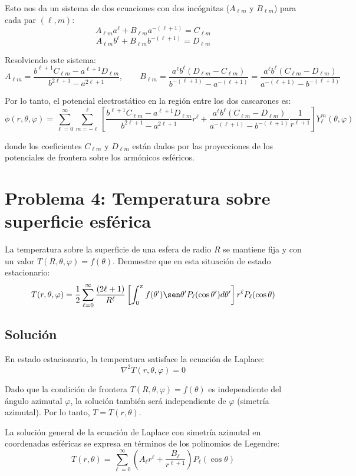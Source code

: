 \documentclass[a4paper]{article}
\begin{document}
Esto nos da un sistema de dos ecuaciones con dos incógnitas ($A_{\ell m}$ y $B_{\ell m}$) para cada par $(\ell,m)$:
$$
A_{\ell m} a^\ell + B_{\ell m} a^{-(\ell+1)} = C_{\ell m}
$$
$$
A_{\ell m} b^\ell + B_{\ell m} b^{-(\ell+1)} = D_{\ell m}
$$

Resolviendo este sistema:
$$
A_{\ell m} = \frac{b^{\ell+1}C_{\ell m} - a^{\ell+1}D_{\ell m}}{b^{2\ell+1} - a^{2\ell+1}}, \qquad 
B_{\ell m} = \frac{a^\ell b^\ell (D_{\ell m} - C_{\ell m})}{b^{-(\ell+1)} - a^{-(\ell+1)}} = \frac{a^\ell b^\ell (C_{\ell m} - D_{\ell m})}{a^{-(\ell+1)} - b^{-(\ell+1)}}
$$

Por lo tanto, el potencial electrostático en la región entre los dos cascarones es:
$$
\phi(r,\theta,\varphi) = \sum_{\ell=0}^{\infty} \sum_{m=-\ell}^{\ell} \left[ \frac{b^{\ell+1}C_{\ell m} - a^{\ell+1}D_{\ell m}}{b^{2\ell+1} - a^{2\ell+1}} r^\ell + \frac{a^\ell b^\ell (C_{\ell m} - D_{\ell m})}{a^{-(\ell+1)} - b^{-(\ell+1)}} \frac{1}{r^{\ell+1}} \right] Y_\ell^m(\theta,\varphi)
$$

donde los coeficientes $C_{\ell m}$ y $D_{\ell m}$ están dados por las proyecciones de los potenciales de frontera sobre los armónicos esféricos.

\section{Problema 4: Temperatura sobre superficie esférica}
La temperatura sobre la superficie de una esfera de radio $R$ se mantiene fija y con un valor $T(R, \theta, \varphi) = f(\theta)$. Demuestre que en esta situación de estado estacionario:
$$
T(r,\theta,\varphi) = \frac{1}{2} \sum_{\ell=0}^{\infty} \frac{(2\ell+1)}{R^\ell} \left[ \int_0^{\pi} f(\theta') \sen\theta' P_\ell(\cos\theta') d\theta' \right] r^\ell P_\ell(\cos\theta)
$$

\subsection{Solución}

En estado estacionario, la temperatura satisface la ecuación de Laplace:
$$
\nabla^2 T(r,\theta,\varphi) = 0
$$

Dado que la condición de frontera $T(R,\theta,\varphi) = f(\theta)$ es independiente del ángulo azimutal $\varphi$, la solución también será independiente de $\varphi$ (simetría azimutal). Por lo tanto, $T = T(r,\theta)$.

La solución general de la ecuación de Laplace con simetría azimutal en coordenadas esféricas se expresa en términos de los polinomios de Legendre:
$$
T(r,\theta) = \sum_{\ell=0}^{\infty} \left( A_\ell r^\ell + \frac{B_\ell}{r^{\ell+1}} \right) P_\ell(\cos\theta)
$$
\end{document}
